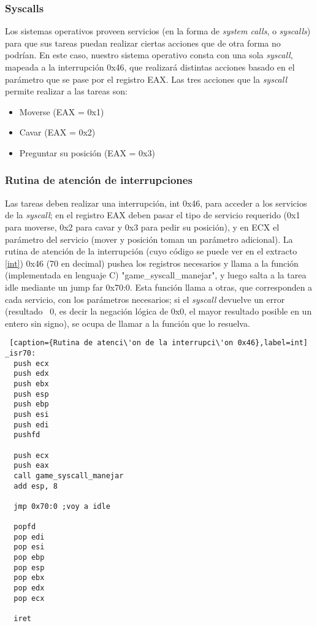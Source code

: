 \subsubsection*{Syscalls}
\par Los sistemas operativos proveen servicios (en la forma de \textit{system calls}, o \textit{syscalls}) para que sus tareas puedan realizar ciertas acciones que de otra forma no podr\'ian. En este caso, nuestro sistema operativo consta con una sola \textit{syscall}, mapeada a la interrupci\'on 0x46, que realizar\'a distintas acciones basado en el par\'ametro que se pase por el registro EAX.
Las tres acciones que la \textit{syscall} permite realizar a las tareas son:
\begin{itemize}
    \item Moverse (EAX = 0x1)
    \item Cavar (EAX = 0x2)
    \item Preguntar su posici\'on (EAX = 0x3)
\end{itemize}

\subsubsection*{Rutina de atenci\'on de interrupciones}
\par Las tareas deben realizar una interrupci\'on, int 0x46, para acceder a los servicios de la \textit{syscall}; en el registro EAX deben pasar el tipo de servicio requerido (0x1 para moverse, 0x2 para cavar y 0x3 para pedir su posici\'on), y en ECX el par\'ametro del servicio (mover y posici\'on toman un par\'ametro adicional).
La rutina de atenci\'on de la interrupci\'on (cuyo c\'odigo se puede ver en el extracto \ref{int}) 0x46 (70 en decimal) pushea los registros necesarios y llama a la funci\'on (implementada en lenguaje C) "game\_syscall\_manejar", y luego salta a la tarea idle mediante un jump far 0x70:0. Esta funci\'on llama a otras, que corresponden a cada servicio, con los par\'ametros necesarios; si el \textit{syscall} devuelve un error (resultado ~0, es decir la negaci\'on l\'ogica de 0x0, el mayor resultado posible en un entero sin signo), se ocupa de llamar a la funci\'on que lo resuelva.

\begin{lstlisting} [caption={Rutina de atenci\'on de la interrupci\'on 0x46},label=int]
_isr70:
  push ecx
  push edx
  push ebx
  push esp
  push ebp
  push esi
  push edi
  pushfd
  
  push ecx
  push eax
  call game_syscall_manejar
  add esp, 8

  jmp 0x70:0 ;voy a idle
 
  popfd
  pop edi
  pop esi
  pop ebp
  pop esp
  pop ebx
  pop edx
  pop ecx
  
  iret

\end{lstlisting}



